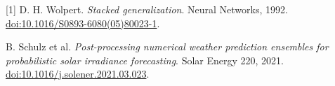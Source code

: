 \documentclass[10pt,a4paper]{article}
\begin{document}
\vspace{3mm}
{\scriptsize\color{muted}
[1] D. H. Wolpert. \emph{Stacked generalization}. Neural Networks, 1992. \href{https://doi.org/10.1016/S0893-6080(05)80023-1}{doi:10.1016/S0893-6080(05)80023-1}.\par
[2] B. Schulz et al. \emph{Post-processing numerical weather prediction ensembles for probabilistic solar irradiance forecasting}. Solar Energy 220, 2021. \href{https://doi.org/10.1016/j.solener.2021.03.023}{doi:10.1016/j.solener.2021.03.023}.
}
\end{document}
